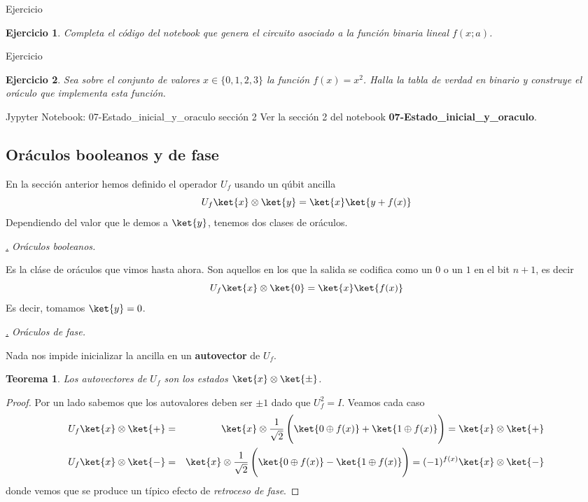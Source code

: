 \documentclass[a4paper,11pt]{book} %
\newtheorem{teorema_contador}{Teorema}
\newcommand{\Teorema}[1]{
		\begin{mybox_gray2}{}
			\begin{teorema_contador}
				 #1 
			\end{teorema_contador} 
		\end{mybox_gray2}
	}
\newtheorem{ejercicio_contador}{Ejercicio}
\newcommand{\Ejercicio}[1]{
		\begin{mybox_gray}{Ejercicio} 
			\begin{ejercicio_contador}
				 #1 
			\end{ejercicio_contador} 
		\end{mybox_gray}
	}
\numberwithin{equation}{chapter}
\def\subsubiContadorIt{\par\addtocounter{subsubsection}{1}\underline{\it\thesubsubsection.}\hskip0.5cm \setcounter{subsubsubsectionIt}{0}}
\newcommand{\SubsubiIt}[1]{
		\subsubiContadorIt \textit{#1}
	}
\newcounter{subsubsubsectionIt}[subsubsection]
\begin{document}
	\Ejercicio{
	Completa el código del notebook que genera el circuito asociado a la función binaria lineal $f(x;a)$.
	}
	
	\Ejercicio{
	Sea sobre el conjunto de valores $x\in \{0,1,2,3\}$ la función $f(x) = x^2$. Halla la tabla de verdad 
	en binario y construye el oráculo que implementa esta función.
	}



	\begin{mybox_orange}{Jypyter Notebook: 07-Estado\_inicial\_y\_oraculo sección 2}
	Ver la sección 2 del notebook \textbf{07-Estado\_inicial\_y\_oraculo}.
	\end{mybox_orange}
	
    	
    	
    	\subsection{Oráculos booleanos y de fase}

En la sección anterior hemos definido el operador  $U_f$ usando un qúbit ancilla
$$
U_f \ket{x}\otimes\ket{y} = \ket{x}\ket{y + f(x)}
$$
Dependiendo del valor que le demos a $\ket{y}$, tenemos dos clases de oráculos. 


			\SubsubiIt{Oráculos booleanos.}

Es la cláse de oráculos que vimos hasta ahora. Son aquellos en los que la salida se codifica como un $0$ o un $1$ en el bit $n+1$, es decir
$$
U_f \ket{x}\otimes\ket{0} = \ket{x}\ket{f(x)}
$$
Es decir, tomamos $\ket{y} = 0$.

			\SubsubiIt{Oráculos de fase.} 

Nada nos impide inicializar la ancilla en un \textbf{autovector} de $U_f$. 

	\Teorema{
	Los autovectores de $U_f$ son los estados $\ket{x}\otimes \ket{\pm}$.
	}
	
	\begin{proof}
	Por un lado sabemos que los autovalores deben ser $\pm 1$ dado que $U_f^2 = I$. Veamos cada caso
	\begin{eqnarray}
	U_f\ket{x}\otimes \ket{+} &=& \ket{x}\otimes \frac{1}{\sqrt{2}}\left( \rule{0mm}{6mm}\ket{0\oplus f(x)}+\ket{1\oplus f(x)} \right) 
	= 	\ket{x}\otimes \ket{+} \nonumber\\
	U_f\ket{x}\otimes \ket{-} &=& \ket{x}\otimes \frac{1}{\sqrt{2}}\left( \rule{0mm}{6mm} \ket{0\oplus f(x)}-\ket{1\oplus f(x)}\right) 
	= (-1)^{f(x)} \ket{x}\otimes \ket{-} \nonumber
	\end{eqnarray}
	donde vemos que se produce un típico efecto de \textit{retroceso de fase}.
	\end{proof}
\end{document}
